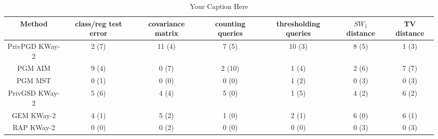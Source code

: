 \begin{table}[t!]
\centering
\begin{tabular}{ccccccc}
\toprule
Method & class/reg test error & covariance matrix & counting queries & thresholding queries & $SW_1$ distance & TV distance \\
\midrule
 PrivPGD KWay-2 & 2 (7) & 11 (4) & 7 (5) & 10 (3) & 8 (5) & 1 (3) \\
 PGM AIM & 9 (4) & 0 (7) & 2 (10) & 1 (4) & 2 (6) & 7 (7) \\
 PGM MST & 0 (1) & 0 (0) & 0 (0) & 1 (2) & 0 (3) & 0 (3) \\
 PrivGSD KWay-2 & 5 (6) & 4 (4) & 5 (0) & 1 (5) & 4 (2) & 6 (2) \\
 GEM KWay-2 & 4 (1) & 5 (2) & 1 (0) & 2 (1) & 6 (0) & 6 (1) \\
 RAP  KWay-2 & 0 (0) & 0 (2) & 0 (0) & 0 (0) & 0 (3) & 0 (3) \\
\bottomrule
\end{tabular}
\caption{Your Caption Here}
\label{tab:your_label}
\end{table}